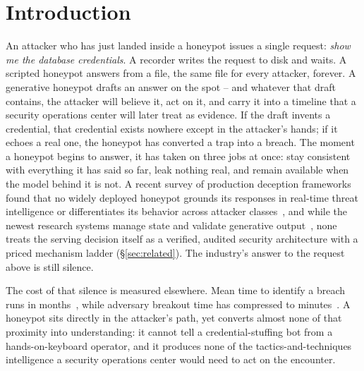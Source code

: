 \section{Introduction}
\label{sec:intro}

An attacker who has just landed inside a honeypot issues a single
request: \emph{show me the database credentials}. A recorder writes the
request to disk and waits. A scripted honeypot answers from a file, the
same file for every attacker, forever. A generative honeypot drafts an
answer on the spot -- and whatever that draft contains, the attacker
will believe it, act on it, and carry it into a timeline that a security
operations center will later treat as evidence. If the draft invents a
credential, that credential exists nowhere except in the attacker's
hands; if it echoes a real one, the honeypot has converted a trap into a
breach. The moment a honeypot begins to answer, it has taken on three
jobs at once: stay consistent with everything it has said so far, leak
nothing real, and remain available when the model behind it is not. A
recent survey of production deception frameworks found that no widely
deployed honeypot grounds its responses in real-time threat intelligence
or differentiates its behavior across attacker
classes~\cite{lopez2024}, and while the newest research systems manage
state and validate generative
output~\cite{li2026llmsshh,laragutierrez2026genpot}, none treats the
serving decision itself as a verified, audited security architecture
with a priced mechanism ladder (\S\ref{sec:related}). The industry's
answer to the request above is still silence.

The cost of that silence is measured elsewhere. Mean time to identify a
breach runs in months~\cite{ibm2024}, while adversary breakout time has
compressed to minutes~\cite{crowdstrike2026}. A honeypot sits directly
in the attacker's path, yet converts almost none of that proximity into
understanding: it cannot tell a credential-stuffing bot from a
hands-on-keyboard operator, and it produces none of the
tactics-and-techniques intelligence a security operations center would
need to act on the encounter.

